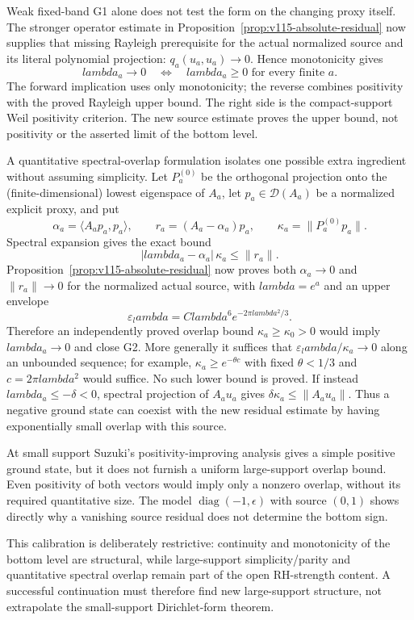 \documentclass[11pt]{article}
\def\lambda{lambda}%
\theoremstyle{remark}
\begin{document}
Weak fixed-band G1 alone does not test the form on the changing
proxy itself. The stronger operator estimate in
Proposition~\ref{prop:v115-absolute-residual} now supplies that missing
Rayleigh prerequisite for the actual normalized source and its literal
polynomial projection: $q_a(u_a,u_a)\to0$. Hence monotonicity gives
\[
 \lambda_a\to0\quad\Longleftrightarrow\quad
 \lambda_a\ge0\text{ for every finite }a.
\]
The forward implication uses only monotonicity; the reverse combines
positivity with the proved Rayleigh upper bound. The right side is the
compact-support Weil positivity criterion. The new source estimate
proves the upper bound, not positivity or the asserted limit of the
bottom level.

A quantitative spectral-overlap formulation isolates one possible extra ingredient without assuming simplicity.  Let $P_a^{(0)}$ be the orthogonal projection onto the (finite-dimensional) lowest eigenspace of $A_a$, let $p_a\in\mathcal D(A_a)$ be a normalized explicit proxy, and put
\[
 \alpha_a=\langle A_ap_a,p_a\rangle,
 \qquad
 r_a=(A_a-\alpha_a)p_a,
 \qquad
 \kappa_a=\|P_a^{(0)}p_a\|.
\]
Spectral expansion gives the exact bound
\[
 \boxed{
 |\lambda_a-\alpha_a|\,\kappa_a\le \|r_a\|.
 }
 \tag{G2.3}
\]
Proposition~\ref{prop:v115-absolute-residual} now proves both
$\alpha_a\to0$ and $\|r_a\|\to0$ for the normalized actual source,
with $\lambda=e^a$ and an upper envelope
\[
 \varepsilon_\lambda=C\lambda^6e^{-2\pi\lambda^2/3}.
\]
Therefore an independently proved overlap bound
$\kappa_a\ge\kappa_0>0$ would imply $\lambda_a\to0$ and close G2.
More generally it suffices that
$\varepsilon_\lambda/\kappa_a\to0$ along an unbounded sequence;
for example, $\kappa_a\ge e^{-\theta c}$ with fixed
$\theta<1/3$ and $c=2\pi\lambda^2$ would suffice.
No such lower bound is proved. If instead
$\lambda_a\le-\delta<0$, spectral projection of
$A_au_a$ gives $\delta\kappa_a\le\|A_au_a\|$.
Thus a negative ground state can coexist with the new residual estimate
by having exponentially small overlap with this source.

At small support Suzuki's positivity-improving analysis gives a simple
positive ground state, but it does not furnish a uniform large-support
overlap bound. Even positivity of both vectors would imply only a
nonzero overlap, without its required quantitative size. The model
$\operatorname{diag}(-1,\epsilon)$ with source $(0,1)$ shows directly
why a vanishing source residual does not determine the bottom sign.

This calibration is deliberately restrictive: continuity and monotonicity of the bottom level are structural, while large-support simplicity/parity and quantitative spectral overlap remain part of the open RH-strength content.  A successful continuation must therefore find new large-support structure, not extrapolate the small-support Dirichlet-form theorem.
\end{document}

